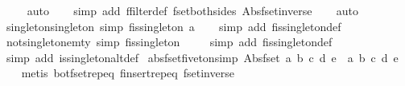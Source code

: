 \begin{isabellebody}
\ \ \ \isamarkupfalse%
\ auto{\isacharbrackleft}{}{\isacharbrackright}\isanewline
\ \ \isamarkupfalse%
\ {\isacharparenleft}simp\ add{\isacharcolon}\ ffilter{\isacharunderscore}def\ fset{\isacharunderscore}both{\isacharunderscore}sides\ Abs{\isacharunderscore}fset{\isacharunderscore}inverse{\isacharparenright}\isanewline
\ \ \isamarkupfalse%
\ auto%
\endisatagproof
{\isafoldproof}%
%
\isadelimproof
\isanewline
%
\endisadelimproof
\isanewline
{}\isamarkupfalse%
\ singleton{\isacharunderscore}singleton\ {\isacharbrackleft}simp{\isacharbrackright}{\isacharcolon}\ {\isachardoublequoteopen}fis{\isacharunderscore}singleton\ {\isacharbraceleft}{\isacharbar}a{\isacharbar}{\isacharbraceright}{\isachardoublequoteclose}\isanewline
%
\isadelimproof
\ \ %
\endisadelimproof
%
\isatagproof
{}\isamarkupfalse%
\ {\isacharparenleft}simp\ add{\isacharcolon}\ fis{\isacharunderscore}singleton{\isacharunderscore}def{\isacharparenright}%
\endisatagproof
{\isafoldproof}%
%
\isadelimproof
\isanewline
%
\endisadelimproof
\isanewline
{}\isamarkupfalse%
\ not{\isacharunderscore}singleton{\isacharunderscore}emty\ {\isacharbrackleft}simp{\isacharbrackright}{\isacharcolon}\ {\isachardoublequoteopen}{\isasymnot}fis{\isacharunderscore}singleton\ {\isacharbraceleft}{\isacharbar}{\isacharbar}{\isacharbraceright}{\isachardoublequoteclose}\isanewline
%
\isadelimproof
\ \ %
\endisadelimproof
%
\isatagproof
{}\isamarkupfalse%
\ {\isacharparenleft}simp\ add{\isacharcolon}\ fis{\isacharunderscore}singleton{\isacharunderscore}def{\isacharparenright}\isanewline
\ \ \isamarkupfalse%
\ {\isacharparenleft}simp\ add{\isacharcolon}\ is{\isacharunderscore}singleton{\isacharunderscore}altdef{\isacharparenright}%
\endisatagproof
{\isafoldproof}%
%
\isadelimproof
\isanewline
%
\endisadelimproof
\isanewline
{}\isamarkupfalse%
\ abs{\isacharunderscore}fset{\isacharunderscore}fiveton{\isacharbrackleft}simp{\isacharbrackright}{\isacharcolon}\ {\isachardoublequoteopen}Abs{\isacharunderscore}fset\ {\isacharbraceleft}a{\isacharcomma}\ b{\isacharcomma}\ c{\isacharcomma}\ d{\isacharcomma}\ e{\isacharbraceright}\ {\isacharequal}\ {\isacharbraceleft}{\isacharbar}a{\isacharcomma}\ b{\isacharcomma}\ c{\isacharcomma}\ d{\isacharcomma}\ e{\isacharbar}{\isacharbraceright}{\isachardoublequoteclose}\isanewline
%
\isadelimproof
\ \ %
\endisadelimproof
%
\isatagproof
{}\isamarkupfalse%
\ {\isacharparenleft}metis\ bot{\isacharunderscore}fset{\isachardot}rep{\isacharunderscore}eq\ finsert{\isachardot}rep{\isacharunderscore}eq\ fset{\isacharunderscore}inverse{\isacharparenright}%

\end{isabellebody}
